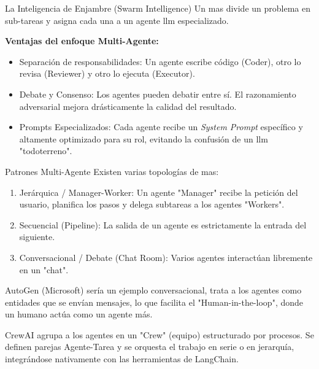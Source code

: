 \begin{frame}{La Inteligencia de Enjambre (Swarm Intelligence)}
Un \alert{\gls{mas}} divide un problema en \alert{sub-tareas} y asigna cada una a un agente \gls{llm} especializado.

\textbf{Ventajas del enfoque Multi-Agente:}
\begin{itemize}
    \item \alert{Separación de responsabilidades:} Un agente escribe código (Coder), otro lo revisa (Reviewer) y otro lo ejecuta (Executor).
    \item \alert{Debate y Consenso:} Los agentes pueden debatir entre sí. El razonamiento adversarial mejora drásticamente la calidad del resultado.
    \item \alert{Prompts Especializados:} Cada agente recibe un \textit{System Prompt} específico y altamente optimizado para su rol, evitando la confusión de un \gls{llm} "todoterreno".
\end{itemize}
\end{frame}

\begin{frame}{Patrones Multi-Agente}
Existen varias topologías de \gls{mas}:

\begin{enumerate}
    \item \alert{Jerárquica / Manager-Worker:} Un agente "Manager" recibe la petición del usuario, planifica los pasos y delega subtareas a los agentes "Workers".
    \item \alert{Secuencial (Pipeline):} La salida de un agente es estrictamente la entrada del siguiente.
    \item \alert{Conversacional / Debate (Chat Room):} Varios agentes interactúan libremente en un "chat".
\end{enumerate}

\alert{AutoGen (Microsoft)} \cite{wu2023autogen} sería un ejemplo conversacional, trata a los agentes como entidades que se envían mensajes, lo que facilita el "\alert{Human-in-the-loop}", donde un humano actúa como un agente más.

\alert{CrewAI} \cite{crewai2024} agrupa a los agentes en un "Crew" (equipo) estructurado por procesos. Se definen parejas \alert{Agente-Tarea} y se orquesta el trabajo en \alert{serie o en jerarquía}, integrándose nativamente con las herramientas de LangChain.
\end{frame}
 
